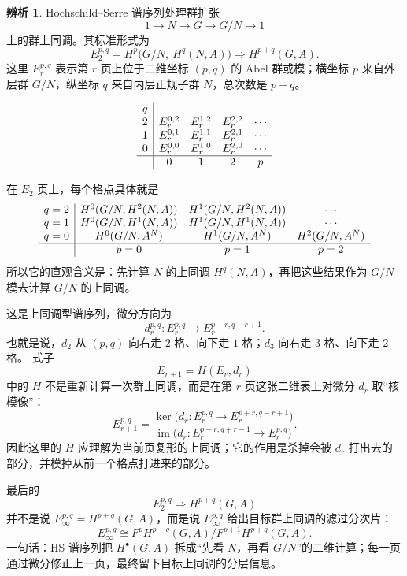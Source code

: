 \documentclass[a4paper]{ctexart}
\theoremstyle{definition}
\theoremstyle{analysis}
\newtheorem{remark}{辨析}[section]
\theoremstyle{plain}
\begin{document}
\begin{remark}
\label{rem:hs-spectral-sequence-plane}
Hochschild--Serre 谱序列处理群扩张
\[
  1\to N\to G\to G/N\to 1
\]
上的群上同调。其标准形式为
\[
  E_2^{p,q}=H^p\bigl(G/N,\ H^q(N,A)\bigr)
  \Longrightarrow H^{p+q}(G,A).
\]
这里 \(E_r^{p,q}\) 表示第 \(r\) 页上位于二维坐标 \((p,q)\) 的 Abel 群或模；横坐标 \(p\) 来自外层群 \(G/N\)，纵坐标 \(q\) 来自内层正规子群 \(N\)，总次数是 \(p+q\)。

\[
\begin{array}{c|cccc}
q & & & & \\
2 & E_r^{0,2} & E_r^{1,2} & E_r^{2,2} & \cdots\\
1 & E_r^{0,1} & E_r^{1,1} & E_r^{2,1} & \cdots\\
0 & E_r^{0,0} & E_r^{1,0} & E_r^{2,0} & \cdots\\
\hline
  & 0 & 1 & 2 & p
\end{array}
\]

在 \(E_2\) 页上，每个格点具体就是
\[
\begin{array}{c|ccc}
q=2 & H^0(G/N,H^2(N,A)) & H^1(G/N,H^2(N,A)) & \cdots\\
q=1 & H^0(G/N,H^1(N,A)) & H^1(G/N,H^1(N,A)) & \cdots\\
q=0 & H^0(G/N,A^N)      & H^1(G/N,A^N)      & H^2(G/N,A^N)\\
\hline
    & p=0 & p=1 & p=2
\end{array}
\]
所以它的直观含义是：先计算 \(N\) 的上同调 \(H^q(N,A)\)，再把这些结果作为 \(G/N\)-模去计算 \(G/N\) 的上同调。

这是上同调型谱序列，微分方向为
\[
  d_r^{p,q}:E_r^{p,q}\longrightarrow E_r^{p+r,q-r+1}.
\]
也就是说，\(d_2\) 从 \((p,q)\) 向右走 \(2\) 格、向下走 \(1\) 格；\(d_3\) 向右走 \(3\) 格、向下走 \(2\) 格。
式子
\[
  E_{r+1}=H(E_r,d_r)
\]
中的 \(H\) 不是重新计算一次群上同调，而是在第 \(r\) 页这张二维表上对微分 \(d_r\) 取“核模像”：
\[
  E_{r+1}^{p,q}
  =
  \frac{\ker\bigl(d_r:E_r^{p,q}\to E_r^{p+r,q-r+1}\bigr)}
       {\operatorname{im}\bigl(d_r:E_r^{p-r,q+r-1}\to E_r^{p,q}\bigr)}.
\]
因此这里的 \(H\) 应理解为当前页复形的上同调；它的作用是杀掉会被 \(d_r\) 打出去的部分，并模掉从前一个格点打进来的部分。

最后的
\[
  E_2^{p,q}\Longrightarrow H^{p+q}(G,A)
\]
并不是说 \(E_\infty^{p,q}=H^{p+q}(G,A)\)，而是说 \(E_\infty^{p,q}\) 给出目标群上同调的滤过分次片：
\[
  E_\infty^{p,q}\cong
  F^pH^{p+q}(G,A)/F^{p+1}H^{p+q}(G,A).
\]
一句话：HS 谱序列把 \(H^\bullet(G,A)\) 拆成“先看 \(N\)，再看 \(G/N\)”的二维计算；每一页通过微分修正上一页，最终留下目标上同调的分层信息。
\end{remark}
\end{document}
